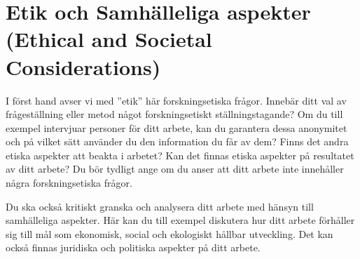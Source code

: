 \section{Etik och Samhälleliga aspekter (Ethical and Societal Considerations)}

I f\"{o}rst hand avser vi med ”etik” h\"{a}r forskningsetiska fr\r{a}gor. Inneb\"{a}r ditt val av fr\r{a}gest\"{a}llning eller metod n\r{a}got forskningsetiskt st\"{a}llningstagande? Om du till exempel intervjuar personer f\"{o}r ditt arbete, kan du garantera dessa anonymitet och p\r{a} vilket s\"{a}tt anv\"{a}nder du den information du f\r{a}r av dem? Finns det andra etiska aspekter att beakta i arbetet? Kan det finnas etiska aspekter p\r{a} resultatet av ditt arbete? Du b\"{o}r tydligt ange om du anser att ditt arbete inte inneh\r{a}ller n\r{a}gra forskningsetiska fr\r{a}gor. 

Du ska ocks\r{a} kritiskt granska och analysera ditt arbete med h\"{a}nsyn till samh\"{a}lleliga aspekter. H\"{a}r kan du till exempel diskutera hur ditt arbete f\"{o}rh\r{a}ller sig till m\r{a}l som ekonomisk, social och ekologiskt h\r{a}llbar utveckling. Det kan ocks\r{a} finnas juridiska och politiska aspekter p\r{a} ditt arbete. 
